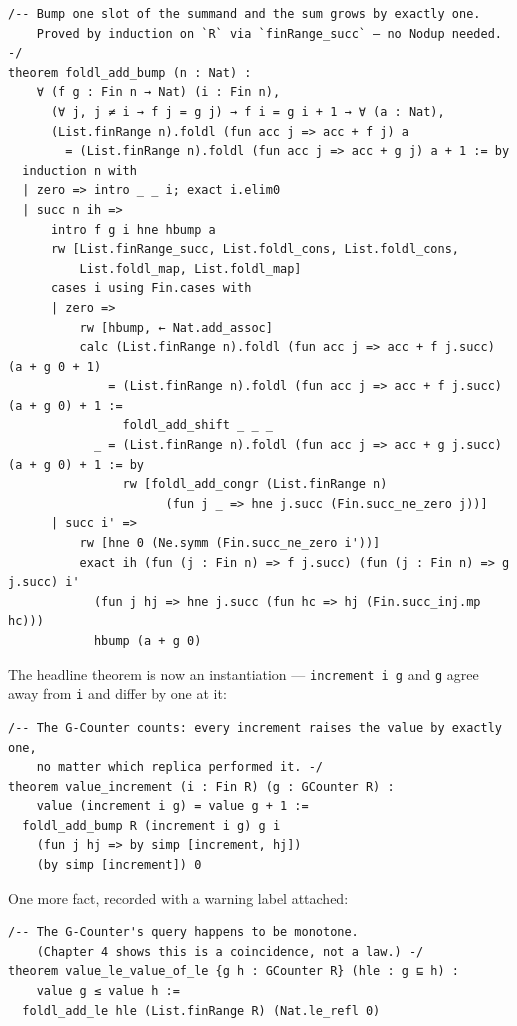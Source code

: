 \documentclass[12pt, a4paper, openright]{book}
\theoremstyle{thmstyle}
\theoremstyle{defstyle}
\newcommand{\lc}[1]{\texttt{#1}}
\begin{document}
\begin{verbatim}
/-- Bump one slot of the summand and the sum grows by exactly one.
    Proved by induction on `R` via `finRange_succ` — no Nodup needed. -/
theorem foldl_add_bump (n : Nat) :
    ∀ (f g : Fin n → Nat) (i : Fin n),
      (∀ j, j ≠ i → f j = g j) → f i = g i + 1 → ∀ (a : Nat),
      (List.finRange n).foldl (fun acc j => acc + f j) a
        = (List.finRange n).foldl (fun acc j => acc + g j) a + 1 := by
  induction n with
  | zero => intro _ _ i; exact i.elim0
  | succ n ih =>
      intro f g i hne hbump a
      rw [List.finRange_succ, List.foldl_cons, List.foldl_cons,
          List.foldl_map, List.foldl_map]
      cases i using Fin.cases with
      | zero =>
          rw [hbump, ← Nat.add_assoc]
          calc (List.finRange n).foldl (fun acc j => acc + f j.succ) (a + g 0 + 1)
              = (List.finRange n).foldl (fun acc j => acc + f j.succ) (a + g 0) + 1 :=
                foldl_add_shift _ _ _
            _ = (List.finRange n).foldl (fun acc j => acc + g j.succ) (a + g 0) + 1 := by
                rw [foldl_add_congr (List.finRange n)
                      (fun j _ => hne j.succ (Fin.succ_ne_zero j))]
      | succ i' =>
          rw [hne 0 (Ne.symm (Fin.succ_ne_zero i'))]
          exact ih (fun (j : Fin n) => f j.succ) (fun (j : Fin n) => g j.succ) i'
            (fun j hj => hne j.succ (fun hc => hj (Fin.succ_inj.mp hc)))
            hbump (a + g 0)
\end{verbatim}

The headline theorem is now an instantiation --- \lc{increment i g} and
\lc{g} agree away from \lc{i} and differ by one at it:

\begin{verbatim}
/-- The G-Counter counts: every increment raises the value by exactly one,
    no matter which replica performed it. -/
theorem value_increment (i : Fin R) (g : GCounter R) :
    value (increment i g) = value g + 1 :=
  foldl_add_bump R (increment i g) g i
    (fun j hj => by simp [increment, hj])
    (by simp [increment]) 0
\end{verbatim}

One more fact, recorded with a warning label attached:

\begin{verbatim}
/-- The G-Counter's query happens to be monotone.
    (Chapter 4 shows this is a coincidence, not a law.) -/
theorem value_le_value_of_le {g h : GCounter R} (hle : g ⊑ h) :
    value g ≤ value h :=
  foldl_add_le hle (List.finRange R) (Nat.le_refl 0)
\end{verbatim}
\end{document}
